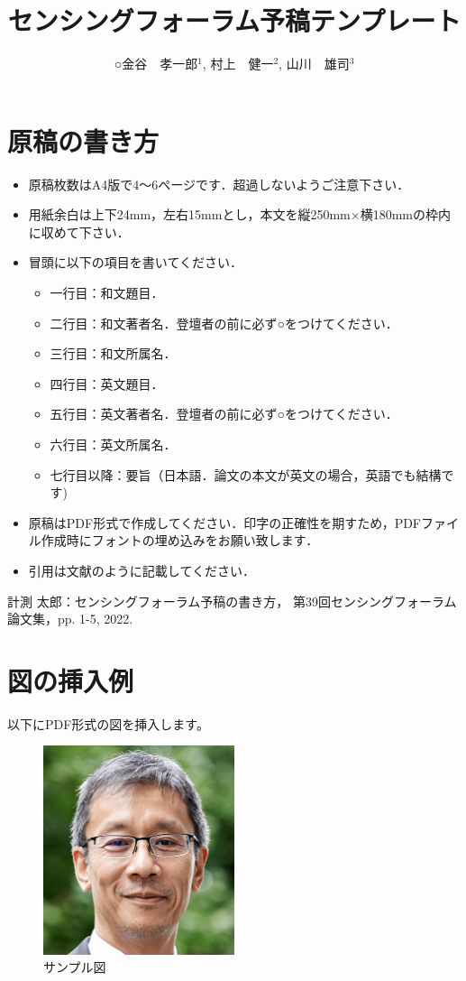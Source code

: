 \documentclass[a4paper]{jarticle}
\title{センシングフォーラム予稿テンプレート}
\author{○金谷　孝一郎$^1$, 村上　健一$^2$, 山川　雄司$^3$}
\affiliation{
$^1$ 東京大学,
$^2$ 東京大学,
$^3$ 東京大学 }
\begin{document}
\maketitle
\iffalse
\section{原稿の書き方}
\begin{itemize}
\item 原稿枚数はA4版で4～6ページです．超過しないようご注意下さい．
\item 用紙余白は上下24mm，左右15mmとし，本文を縦250mm×横180mmの枠内に収めて下さい．
\item 冒頭に以下の項目を書いてください．
\begin{itemize}
\item 一行目：和文題目．
\item 二行目：和文著者名．登壇者の前に必ず○をつけてください．
\item 三行目：和文所属名．
\item 四行目：英文題目．
\item 五行目：英文著者名．登壇者の前に必ず○をつけてください．
\item 六行目：英文所属名．
\item 七行目以降：要旨（日本語．論文の本文が英文の場合，英語でも結構です)
\end{itemize}
\item 原稿はPDF形式で作成してください．印字の正確性を期すため，PDFファイル作成時にフォントの埋め込みをお願い致します．
\item 引用は文献\cite{ref1}のように記載してください．
\end{itemize}
\begin{thebibliography}{9}
計測 太郎：センシングフォーラム予稿の書き方，
第39回センシングフォーラム論文集，pp. 1-5, 2022.
\end{thebibliography}
\section{図の挿入例}
以下にPDF形式の図を挿入します。

\begin{figure}[htbp]
    \centering
    \includegraphics[width=0.5\textwidth]{example.pdf}
    \caption{サンプル図}
    \label{fig:sample}
\end{figure}
\end{document}
